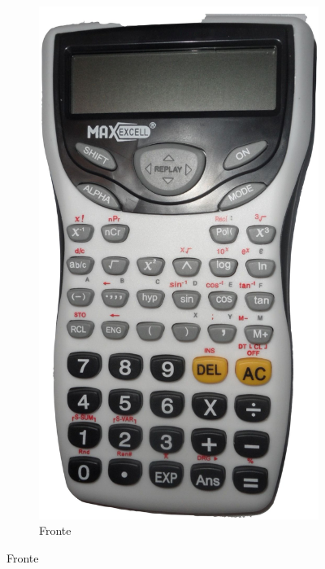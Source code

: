 \begin{figure}
	\begin{subfigure}[b]{.5\linewidth}
	\centering\includegraphics{maxexcell/SAM_3732_2.jpg}%
		\caption{Fronte}\label{fig:Maxcexcellfront}
	\end{subfigure}%
\end{figure}
